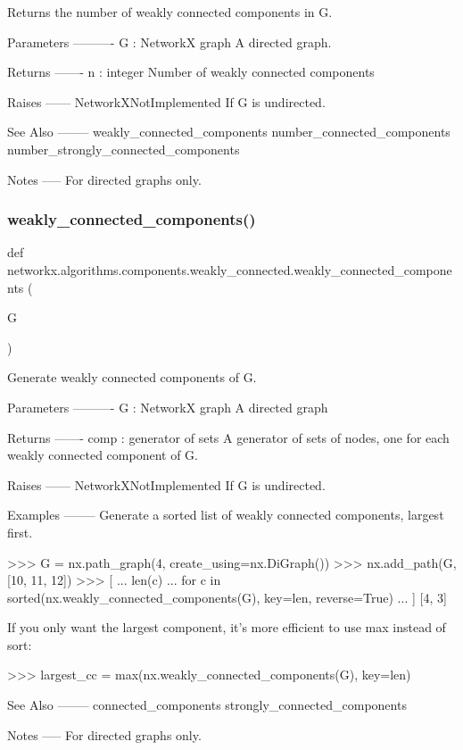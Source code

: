 \begin{DoxyVerb}Returns the number of weakly connected components in G.

Parameters
----------
G : NetworkX graph
    A directed graph.

Returns
-------
n : integer
    Number of weakly connected components

Raises
------
NetworkXNotImplemented
    If G is undirected.

See Also
--------
weakly_connected_components
number_connected_components
number_strongly_connected_components

Notes
-----
For directed graphs only.\end{DoxyVerb}
 \mbox{\label{namespacenetworkx_1_1algorithms_1_1components_1_1weakly__connected_a3ac69a04b73ced987d42f323b00666ee}} 
\subsubsection{\texorpdfstring{weakly\+\_\+connected\+\_\+components()}{weakly\_connected\_components()}}
{\footnotesize\ttfamily def networkx.\+algorithms.\+components.\+weakly\+\_\+connected.\+weakly\+\_\+connected\+\_\+components (\begin{DoxyParamCaption}\item[{}]{G }\end{DoxyParamCaption})}

\begin{DoxyVerb}Generate weakly connected components of G.

Parameters
----------
G : NetworkX graph
    A directed graph

Returns
-------
comp : generator of sets
    A generator of sets of nodes, one for each weakly connected
    component of G.

Raises
------
NetworkXNotImplemented
    If G is undirected.

Examples
--------
Generate a sorted list of weakly connected components, largest first.

>>> G = nx.path_graph(4, create_using=nx.DiGraph())
>>> nx.add_path(G, [10, 11, 12])
>>> [
...     len(c)
...     for c in sorted(nx.weakly_connected_components(G), key=len, reverse=True)
... ]
[4, 3]

If you only want the largest component, it's more efficient to
use max instead of sort:

>>> largest_cc = max(nx.weakly_connected_components(G), key=len)

See Also
--------
connected_components
strongly_connected_components

Notes
-----
For directed graphs only.\end{DoxyVerb}
 